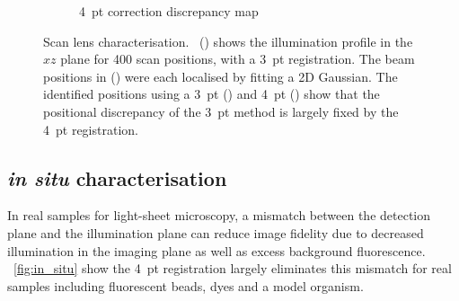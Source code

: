 \begin{figure}
\begin{subfigure}[t]{0.4\textwidth}
        \caption{4~pt correction discrepancy map}
        \label{fig:scan_lens/discrepancyHeatMap4pt_v2}
    \end{subfigure}
    \hfill
    \caption[Scan lens characterisation]{Scan lens characterisation. \figurename~() shows the illumination profile in the \(xz\) plane for 400 scan positions, %
    with a 3~pt registration.
    The beam positions in %
    () were each localised by fitting a \gls{2D} Gaussian.
    The identified positions %
    using a 3~pt () and 4~pt () %
    show that the positional discrepancy of the 3~pt method is largely fixed by the 4~pt registration.
    }
    \label{fig:scan_lens}
\end{figure}

\subsection{\emph{in situ} characterisation}

In real samples for
\gls{light-sheet} microscopy, %
a mismatch between the detection plane and the illumination plane %
can %
reduce image fidelity due to decreased illumination in the imaging plane as well as
excess background fluorescence.
\figurename~\ref{fig:in_situ} show the 4~pt registration largely eliminates this %
mismatch for real samples including fluorescent beads, dyes and a model organism.


